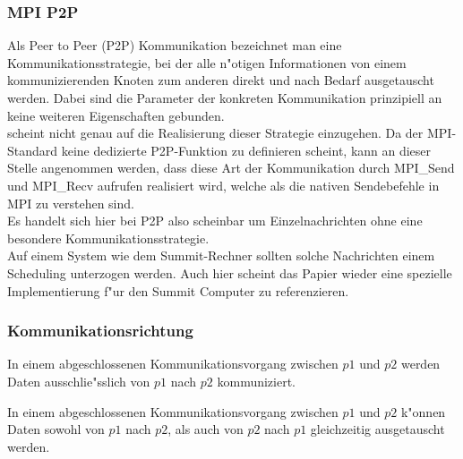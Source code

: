 \subsubsection{MPI P2P}
Als Peer to Peer (P2P) Kommunikation bezeichnet man eine Kommunikationsstrategie, bei der alle n"otigen Informationen von einem kommunizierenden Knoten zum anderen direkt und nach Bedarf ausgetauscht werden. 
Dabei sind die Parameter der konkreten Kommunikation prinzipiell an keine weiteren Eigenschaften gebunden.\\
\cite{mainpaper} scheint nicht genau auf die Realisierung dieser Strategie einzugehen. Da der MPI-Standard keine dedizierte P2P-Funktion zu definieren scheint, kann an dieser Stelle angenommen werden, dass diese Art der Kommunikation durch MPI\_Send und MPI\_Recv aufrufen realisiert wird, welche als die nativen Sendebefehle in MPI zu verstehen sind.\\
Es handelt sich hier bei P2P also scheinbar um Einzelnachrichten ohne eine besondere Kommunikationsstrategie.\\
Auf einem System wie dem Summit-Rechner sollten solche Nachrichten einem Scheduling unterzogen werden.
Auch hier scheint das Papier \cite{mainpaper} wieder eine spezielle Implementierung f"ur den Summit Computer zu referenzieren.

\subsubsection{Kommunikationsrichtung}
\begin{defi}
In einem abgeschlossenen Kommunikationsvorgang zwischen $p1$ und $p2$ werden Daten ausschlie"sslich von $p1$ nach $p2$ kommuniziert.
\end{defi}
\begin{defi}
In einem abgeschlossenen Kommunikationsvorgang zwischen $p1$ und $p2$ k"onnen Daten sowohl von $p1$ nach $p2$, als auch von $p2$ nach $p1$ gleichzeitig ausgetauscht werden.
\end{defi}

